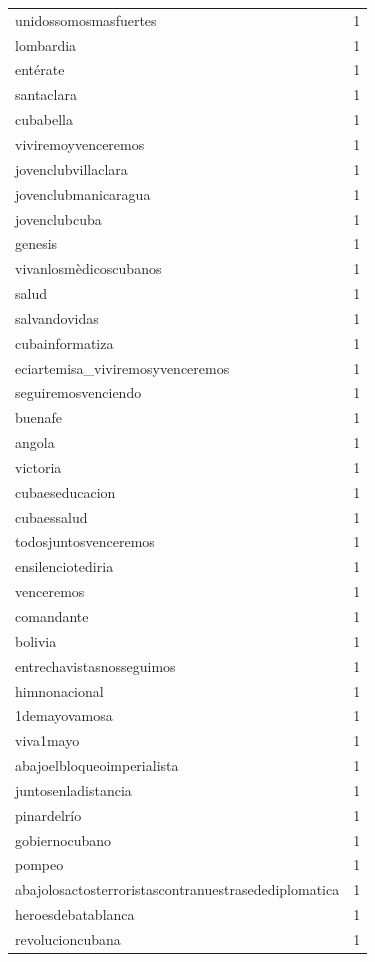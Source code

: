 \begin{tabular}{lr}
unidossomosmasfuertes & 1 \\
lombardia & 1 \\
entérate & 1 \\
santaclara & 1 \\
cubabella & 1 \\
viviremoyvenceremos & 1 \\
jovenclubvillaclara & 1 \\
jovenclubmanicaragua & 1 \\
jovenclubcuba & 1 \\
genesis & 1 \\
vivanlosmèdicoscubanos & 1 \\
salud & 1 \\
salvandovidas & 1 \\
cubainformatiza & 1 \\
eciartemisa\_viviremosyvenceremos & 1 \\
seguiremosvenciendo & 1 \\
buenafe & 1 \\
angola & 1 \\
victoria & 1 \\
cubaeseducacion & 1 \\
cubaessalud & 1 \\
todosjuntosvenceremos & 1 \\
ensilenciotediria & 1 \\
venceremos & 1 \\
comandante & 1 \\
bolivia & 1 \\
entrechavistasnosseguimos & 1 \\
himnonacional & 1 \\
1demayovamosa & 1 \\
viva1mayo & 1 \\
abajoelbloqueoimperialista & 1 \\
juntosenladistancia & 1 \\
pinardelrío & 1 \\
gobiernocubano & 1 \\
pompeo & 1 \\
abajolosactosterroristascontranuestrasedediplomatica & 1 \\
heroesdebatablanca & 1 \\
revolucioncubana & 1 \\
\bottomrule
\end{tabular}
